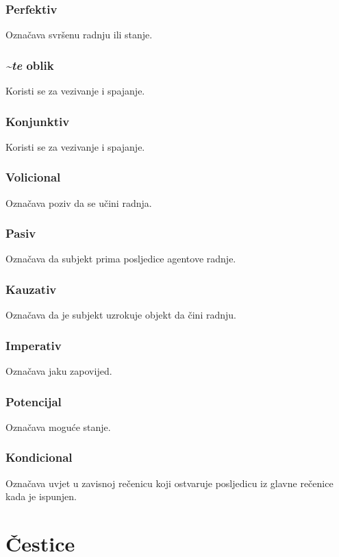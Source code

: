 \documentclass[a4paper, 12pt]{amsart}
\begin{document}
  \subsubsection*{Perfektiv}
  Označava svršenu radnju ili stanje.

  \subsubsection*{\textit{\textasciitilde{}te} oblik}
  Koristi se za vezivanje i spajanje.

  \subsubsection*{Konjunktiv}
  Koristi se za vezivanje i spajanje.

  \subsubsection*{Volicional}
  Označava poziv da se učini radnja.

  \subsubsection*{Pasiv}
  Označava da subjekt prima posljedice agentove radnje.

  \subsubsection*{Kauzativ}
  Označava da je subjekt uzrokuje objekt da čini radnju.

  \subsubsection*{Imperativ}
  Označava jaku zapovijed.

  \subsubsection*{Potencijal}
  Označava moguće stanje.

  \subsubsection*{Kondicional}
  Označava uvjet u zavisnoj rečenicu koji ostvaruje posljedicu iz glav\-ne rečenice kada je ispunjen.

  \section{Čestice}
\end{document}
